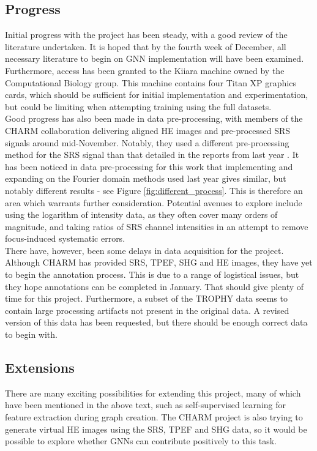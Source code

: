 \subsection{Progress}
Initial progress with the project has been steady, with a good review of the literature undertaken. It is hoped that by the fourth week of December, all necessary literature to begin on GNN implementation will have been examined. Furthermore, access has been granted to the Kiiara machine owned by the Computational Biology group. This machine contains four Titan XP graphics cards, which should be sufficient for initial implementation and experimentation, but could be limiting when attempting training using the full datasets.\\

Good progress has also been made in data pre-processing, with members of the CHARM collaboration delivering aligned HE images and pre-processed SRS signals around mid-November. Notably, they used a different pre-processing method for the SRS signal than that detailed in the reports from last year \cite{vali_deep_2024, petrov_diagnosing_2024}. It has been noticed in data pre-processing for this work that implementing and expanding on the Fourier domain methods used last year gives similar, but notably different results - see Figure \ref{fig:different_process}. This is therefore an area which warrants further consideration. Potential avenues to explore include using the logarithm of intensity data, as they often cover many orders of magnitude, and taking ratios of SRS channel intensities in an attempt to remove focus-induced systematic errors.\\
 

There have, however, been some delays in data acquisition for the project. Although CHARM has provided SRS, TPEF, SHG and HE images, they have yet to begin the annotation process. This is due to a range of logistical issues, but they hope annotations can be completed in January. That should give plenty of time for this project. Furthermore, a subset of the TROPHY data seems to contain large processing artifacts not present in the original data. A revised version of this data has been requested, but there should be enough correct data to begin with.

\subsection{Extensions} \label{sec:extensions}
There are many exciting possibilities for extending this project, many of which have been mentioned in the above text, such as self-supervised learning for feature extraction during graph creation. The CHARM project is also trying to generate virtual HE images using the SRS, TPEF and SHG data, so it would be possible to explore whether GNNs can contribute positively to this task.

